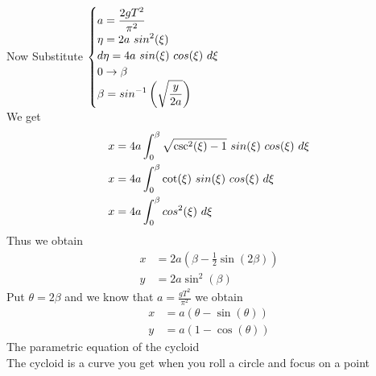 Now Substitute \(
    \begin{cases}
        \displaystyle a = \frac{2g T^2}{\pi^2}
        \\
        \displaystyle \eta = 2a \,\, sin^2(\xi)
        \\
        \displaystyle d\eta = 4a \,\, sin(\xi) \,\, cos(\xi) \,\, d\xi
        \\
        \displaystyle 0 \to \beta
        \\
        \displaystyle \beta = sin^{-1}\left(\sqrt{\frac{y}{2a}}\right)
    \end{cases}
    \)
\\
We get 
\begin{align*}
    x &= 4a \int_{0}^{\beta} \sqrt{\csc^2(\xi) - 1} \,\, sin(\xi) \,\, cos(\xi) \,\, d\xi
    \\
    x &= 4a \int_{0}^{\beta} \cot(\xi) \,\, sin(\xi) \,\, cos(\xi) \,\, d\xi
    \\
    x &= 4a \int_{0}^{\beta} cos^2(\xi) \,\, d\xi
\end{align*}
Thus we obtain
\begin{align*}
    x &= 2a\left(\beta - \frac{1}{2}\sin(2\beta)\right)
    \\
    y &= 2a\sin^2(\beta)
\end{align*}
Put $\theta = 2\beta$ and we know that $\displaystyle a=\frac{gT^2}{\pi^2}$ we obtain
\begin{align*}
    x &= a\left(\theta - \sin(\theta)\right)
    \\
    y &= a(1-\cos(\theta))
\end{align*}
The parametric equation of the cycloid
\\
The cycloid is a curve you get when you roll a circle and focus on a point 
